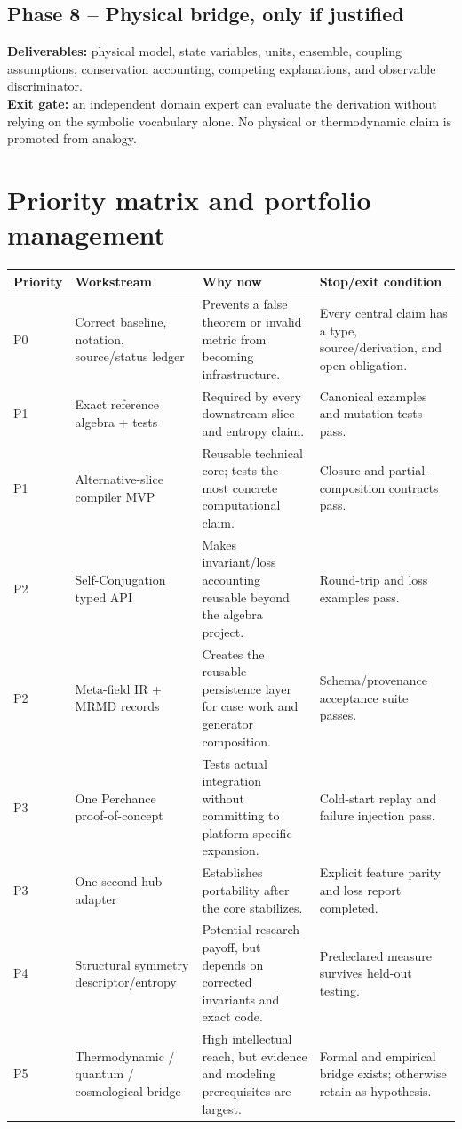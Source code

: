 \documentclass[11pt,oneside]{article}
\begin{document}
\subsection{Phase 8 -- Physical bridge, only if justified}
\textbf{Deliverables:} physical model, state variables, units, ensemble, coupling assumptions, conservation accounting, competing explanations, and observable discriminator.\\
\textbf{Exit gate:} an independent domain expert can evaluate the derivation without relying on the symbolic vocabulary alone. No physical or thermodynamic claim is promoted from analogy.

\section{Priority matrix and portfolio management}
\small
\begin{longtable}{>{\raggedright\arraybackslash}p{}>{\raggedright\arraybackslash}p{}>{\raggedright\arraybackslash}p{}>{\raggedright\arraybackslash}p{}}
\toprule
\textbf{Priority} & \textbf{Workstream} & \textbf{Why now} & \textbf{Stop/exit condition} \\
\midrule
P0 & Correct baseline, notation, source/status ledger & Prevents a false theorem or invalid metric from becoming infrastructure. & Every central claim has a type, source/derivation, and open obligation. \\
P1 & Exact reference algebra + tests & Required by every downstream slice and entropy claim. & Canonical examples and mutation tests pass. \\
P1 & Alternative-slice compiler MVP & Reusable technical core; tests the most concrete computational claim. & Closure and partial-composition contracts pass. \\
P2 & Self-Conjugation typed API & Makes invariant/loss accounting reusable beyond the algebra project. & Round-trip and loss examples pass. \\
P2 & Meta-field IR + MRMD records & Creates the reusable persistence layer for case work and generator composition. & Schema/provenance acceptance suite passes. \\
P3 & One Perchance proof-of-concept & Tests actual integration without committing to platform-specific expansion. & Cold-start replay and failure injection pass. \\
P3 & One second-hub adapter & Establishes portability after the core stabilizes. & Explicit feature parity and loss report completed. \\
P4 & Structural symmetry descriptor/entropy & Potential research payoff, but depends on corrected invariants and exact code. & Predeclared measure survives held-out testing. \\
P5 & Thermodynamic / quantum / cosmological bridge & High intellectual reach, but evidence and modeling prerequisites are largest. & Formal and empirical bridge exists; otherwise retain as hypothesis. \\
\bottomrule
\end{longtable}
\normalsize
\end{document}
